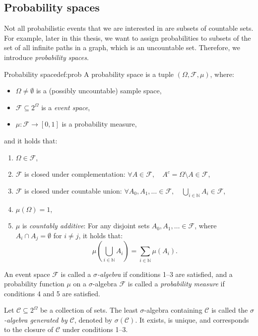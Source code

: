 \subsection{Probability spaces}
Not all probabilistic events that we are interested in are subsets of countable sets. For example, later in this thesis, we want to assign probabilities to subsets of the set of all infinite paths in a graph, which is an uncountable set. Therefore, we introduce \textit{probability spaces}.
\begin{mydefinition}{Probability space}{def:prob}
A probability space is a tuple $(\Omega, \mathcal{F}, \mu)$, where:
\begin{itemize}
    \item $\Omega \neq \emptyset$ is a (possibly uncountable) sample space,
    \item $\mathcal{F} \subseteq 2^\Omega$ is a \textit{event space}, 
    \item $\mu: \mathcal{F} \to [0, 1]$ is a probability measure,
\end{itemize}
and it holds that: 
\begin{enumerate}
    \item $\Omega \in \mathcal{F}$,
    \item $\mathcal{F}$ is closed under complementation: $\forall A \in \mathcal{F},\quad A^c = \Omega \setminus A \in \mathcal{F}$, 
    \item $\mathcal{F}$ is closed under countable union: $\forall A_0, A_1, \dots \in \mathcal{F}, \quad \bigcup_{i \in \mathbb{N}} A_i \in \mathcal{F}$,
    \item $\mu(\Omega) = 1$,
    \item $\mu$ is \textit{countably additive}: For any disjoint sets $A_0, A_1, \dots \in \mathcal{F}$, where $A_i \cap A_j = \emptyset$ for $i \neq j$, it holds that:
    \[
    \mu\left(\bigcup_{i \in \mathbb{N}} A_i\right) = \sum_{i \in \mathbb{N}} \mu(A_i).
    \]
\end{enumerate}
An event space $\mathcal{F}$ is called a \textit{$\sigma$-algebra} if conditions 1–3 are satisfied, and a probability function $\mu$ on a $\sigma$-algebra $\mathcal{F}$ is called a \textit{probability measure} if conditions 4 and 5 are satisfied.

Let $\mathcal{C} \subseteq 2^\Omega$ be a collection of sets. The least $\sigma$-algebra containing $\mathcal{C}$ is called the \textit{$\sigma$-algebra generated by $\mathcal{C}$}, denoted by $\sigma(\mathcal{C})$. It exists, is unique, and corresponds to the closure of $\mathcal{C}$ under conditions 1–3. 
\end{mydefinition}


